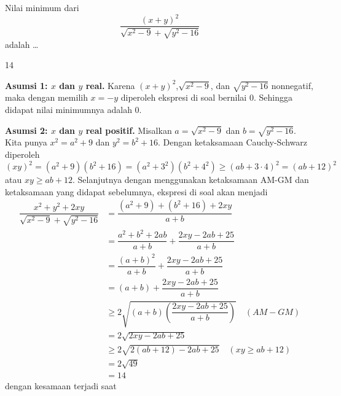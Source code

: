 \documentclass[12pt]{scrartcl}
\begin{document}
\begin{soalbaru}
Nilai minimum dari
$$\dfrac{(x+y)^2}{\sqrt{x^2-9}+\sqrt{y^2-16}}$$
adalah \dots
\end{soalbaru}
\begin{jawaban}
14
\end{jawaban}
\begin{solusi}
\textbf{Asumsi 1: $x$ dan $y$ real.} Karena $(x+y)^2$,$\sqrt{x^2-9}$, dan $\sqrt{y^2-16}$ nonnegatif, maka dengan memilih $x=-y$ diperoleh ekspresi di soal bernilai 0. Sehingga didapat nilai minimumnya adalah 0.

\textbf{Asumsi 2: $x$ dan $y$ real positif.} Misalkan $a = \sqrt{x^2-9}$ dan $b = \sqrt{y^2-16}$. Kita punya $x^2 = a^2 + 9$ dan $y^2 = b^2 + 16$. Dengan ketaksamaan Cauchy-Schwarz diperoleh
$$(xy)^2 = (a^2+9)(b^2+16) = (a^2+3^2)(b^2+4^2) \ge (ab+3\cdot 4)^2 = (ab+12)^2 $$
atau $xy \ge ab+12$. Selanjutnya dengan menggunakan ketaksamaan AM-GM dan ketaksamaan yang didapat sebelumnya, ekspresi di soal akan menjadi
\begin{align*}
\dfrac{x^2+y^2+2xy}{\sqrt{x^2-9}+\sqrt{y^2-16}}&=\dfrac{(a^2+9)+(b^2+16)+2xy}{a+b}\\
&=\dfrac{a^2+b^2+2ab}{a+b}+\dfrac{2xy-2ab+25}{a+b}\\
&=\dfrac{(a+b)^2}{a+b}+\dfrac{2xy-2ab+25}{a+b}\\
&=(a+b)+\dfrac{2xy-2ab+25}{a+b}\\
&\ge 2\sqrt{(a+b)\left(\dfrac{2xy-2ab+25}{a+b}\right)} \quad (AM-GM)\\
&= 2\sqrt{2xy-2ab+25}\\
&\ge 2\sqrt{2(ab+12)-2ab+25} \quad (xy \ge ab+12)\\
&= 2\sqrt{49}\\
&= \boxed{14}
\end{align*}
dengan kesamaan terjadi saat
\end{solusi}
\end{document}
